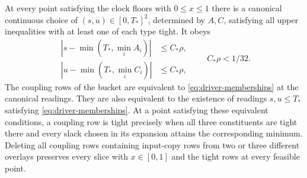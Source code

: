 \begin{lemma}\label{lem:coupling}
At every point satisfying the clock floors with $0\le x\le1$ there is a
canonical continuous choice of $(s,u)\in[0,T_*]^2$, determined by $A,C$,
satisfying all upper inequalities with at least one of each type tight.
It obeys
\begin{equation}\label{eq:canonical-estimate}
 \begin{aligned}
 |s-\min(T_*,\min_i A_i)|&\le C_*\rho,\\
 |u-\min(T_*,\min_i C_i)|&\le C_*\rho,
 \end{aligned}
 \qquad C_*\rho<1/32 .
\end{equation}
The coupling rows of the bucket are equivalent to
\eqref{eq:driver-memberships} at the canonical readings. They are also
equivalent to the existence of readings \(s,u\le T_*\) satisfying
\eqref{eq:driver-memberships}. At a point satisfying these equivalent
conditions, a coupling row is tight precisely when all three constituents
are tight there and every slack chosen in its expansion attains the
corresponding minimum. Deleting all coupling rows containing input-copy
rows from two or three different overlays preserves every slice with
$x\in[0,1]$ and the tight rows at every feasible point.
\end{lemma}


